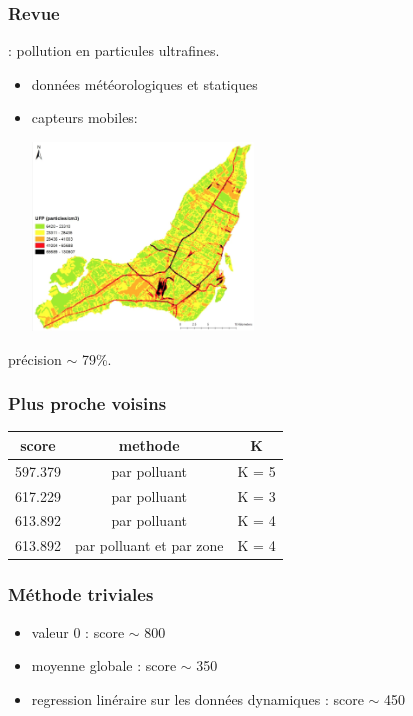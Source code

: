 \documentclass{beamer}
\begin{document}
\begin{frame}
\frametitle{Revue}
\cite{PMreg} : pollution en particules ultrafines.
\begin{itemize}
    \item données météorologiques et statiques
    \item capteurs mobiles:
\begin{center}
  \includegraphics[height=5cm]{images/pollution_montreal.png}
\end{center}
\end{itemize}
précision $\sim$ 79\%.
\end{frame}

\begin{frame}
\frametitle{Plus proche voisins}

\begin{center}
\begin{tabular}{|c|c|c|}
  \hline
  score & methode & K \\
  \hline
  597.379 &  par polluant & K = 5\\
  \hline
  617.229 & par polluant & K = 3\\
  \hline
  613.892 & par polluant  & K = 4\\
  \hline
  613.892 & par polluant et par zone & K = 4\\
  \hline
\end{tabular}
\end{center}
\end{frame}

\begin{frame}
\frametitle{Méthode triviales}
\begin{itemize}
  \item
    valeur 0 : score $\sim$ 800
  \item
    moyenne globale : score $\sim$ 350
  \item regression linéraire sur les données dynamiques : score $\sim$ 450
\end{itemize}
\end{frame}
\end{document}
